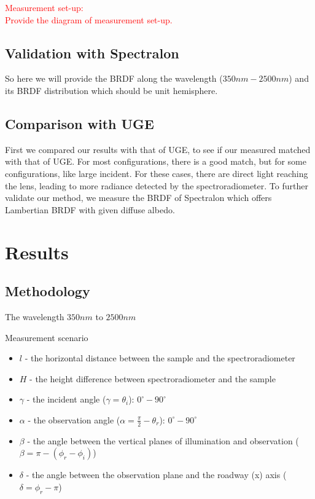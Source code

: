 \textcolor{red}{Measurement set-up:\\
    Provide the diagram of measurement set-up.
}

\subsection{Validation with Spectralon}

So here we will provide the BRDF along the wavelength ($350nm - 2500nm$) and its BRDF distribution which should be unit hemisphere.


\subsection{Comparison with UGE}
First we compared our results with that of UGE, to see if our measured matched with that of UGE.
For most configurations, there is a good match, but for some configurations, like large incident.
For these cases, there are direct light reaching the lens, leading to more radiance detected by the spectroradiometer.
To further validate our method, we measure the BRDF of Spectralon which offers Lambertian BRDF with given diffuse albedo.




\section{Results}

\subsection{Methodology}

The wavelength $350nm$ to $2500nm$

Measurement scenario
\begin{itemize}
    \item $l$ - the horizontal distance between the sample and the spectroradiometer
    \item $H$ - the height difference between spectroradiometer and the sample
    \item $\gamma$ - the incident angle ($\gamma = \theta_i$): $0^{\circ} - 90^{\circ}$

    \item $\alpha$ - the observation angle ($\alpha = \frac{\pi}{2} - \theta_r$): $0^{\circ} - 90^{\circ}$

    \item $\beta$ - the angle between the vertical planes of illumination and observation ($\beta = \pi - (\phi_r - \phi_i)$)
    \item $\delta$ - the angle between the observation plane and the roadway (x) axis ($\delta = \phi_r - \pi$)
\end{itemize}



